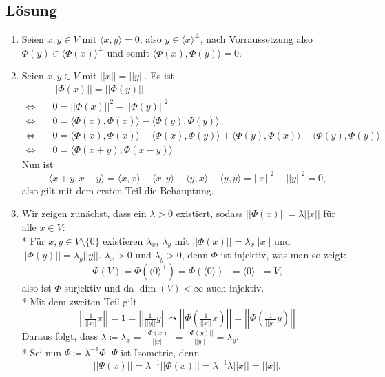 \subsection{Lösung}
\begin{enumerate}
	\item Seien \( x,y \in V \) mit \( \langle x,y \rangle = 0 \), also \( y \in \langle x \rangle^\perp \), nach Vorraussetzung also \( \Phi(y) \in \langle \Phi(x) \rangle^\perp \) und somit \( \langle \Phi(x), \Phi(y) \rangle = 0 \).
	\item Seien \( x,y \in V \) mit \( ||x||=||y|| \). Es ist
		\begin{align*}
			&||\Phi(x)|| = ||\Phi(y)|| \\
			\Leftrightarrow \quad &0 = ||\Phi(x)||^2-||\Phi(y)||^2 \\
			\Leftrightarrow \quad &0 = \langle \Phi(x), \Phi(x) \rangle - \langle \Phi(y),\Phi(y) \rangle \\
			\Leftrightarrow \quad &0 = \langle \Phi(x), \Phi(x) \rangle - \langle \Phi(x),\Phi(y) \rangle + \langle \Phi(y),\Phi(x) \rangle - \langle \Phi(y),\Phi(y) \rangle \\
			\Leftrightarrow \quad &0 = \langle \Phi(x+y),\Phi(x-y) \rangle
		\end{align*}
		Nun ist
		\begin{equation*}
			\langle x+y,x-y \rangle = \langle x,x \rangle - \langle x,y \rangle + \langle y,x \rangle + \langle y,y \rangle = ||x||^2-||y||^2=0\text{,}
		\end{equation*}
		also gilt mit dem ersten Teil die Behauptung.

	\item Wir zeigen zunächst, dass ein \( \lambda > 0 \) existiert, sodass \( ||\Phi(x)|| = \lambda||x|| \) für alle \( x \in V \):
		\\*
		Für \( x,y \in V\setminus \{ 0 \} \) existieren \( \lambda_x \), \( \lambda_y \) mit \( ||\Phi(x)|| = \lambda_x||x|| \) und \( ||\Phi(y)|| = \lambda_y||y|| \). \( \lambda_x > 0 \) und \( \lambda_y > 0 \), denn \( \Phi \) ist injektiv, was man so zeigt:
		\begin{equation*}
			\Phi(V) = \Phi(\langle 0 \rangle^\perp) = \Phi(\langle 0 \rangle)^\perp = \langle 0 \rangle^\perp = V\text{,}
		\end{equation*}
		also ist \( \Phi \) surjektiv und da \( \dim(V) < \infty \) auch injektiv.
		\\*
		Mit dem zweiten Teil gilt
		\begin{equation*}
			\left|\left| \tfrac{1}{||x||}x \right|\right| = 1 = \left|\left| \tfrac{1}{||y||}y \right|\right| \leadsto \left|\left| \Phi\left(\tfrac{1}{||x||}x\right) \right|\right| = \left|\left| \Phi\left(\tfrac{1}{||y||}y\right) \right|\right|
		\end{equation*}
		Daraus folgt, dass \( \lambda \coloneqq \lambda_x = \tfrac{||\Phi(x)||}{||x||} = \tfrac{||\Phi(y)||}{||y||} = \lambda_y \).
		\\*
		Sei nun \( \Psi \coloneqq \lambda^{-1}\Phi \). \( \Psi \) ist Isometrie, denn
		\begin{equation*}
			||\Psi(x)|| = \lambda^{-1}||\Phi(x)|| = \lambda^{-1}\lambda||x|| = ||x||\text{.}
		\end{equation*}
\end{enumerate}